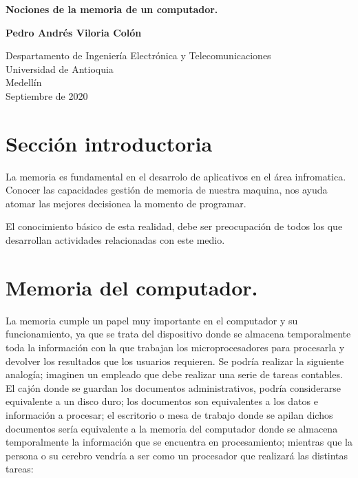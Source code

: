 \documentclass{article}
\begin{document}
\begin{titlepage}
    \begin{center}
        \vspace*{1cm}
            
        \Huge
        \textbf{Nociones de la memoria de un computador.}
            
        \vspace{0.5cm}
        \LARGE
       
        \vspace{1.5cm}
            
        \textbf{Pedro Andrés Viloria Colón}
            
        \vfill
            
        \vspace{0.8cm}
            
        \Large
        Despartamento de Ingeniería Electrónica y Telecomunicaciones\\
        Universidad de Antioquia\\
        Medellín\\
        Septiembre de 2020
            
    \end{center}
\end{titlepage}

\tableofcontents

\section{Sección introductoria}
La memoria es fundamental en el desarrolo de aplicativos en el área infromatica. Conocer las capacidades gestión de memoria de nuestra maquina, nos ayuda  atomar las mejores decisionea la momento de programar.


El conocimiento básico de esta realidad, debe ser preocupación de todos los que desarrollan actividades relacionadas con este medio.

\section{Memoria del computador.} \label{contenido}
La memoria cumple un papel muy importante en el computador y su funcionamiento, ya que se
trata del dispositivo donde se almacena temporalmente toda la información con la que trabajan
los microprocesadores para procesarla y devolver los resultados que los usuarios requieren.
Se podría realizar la siguiente analogía; imaginen un empleado que debe realizar una serie de tareas contables. El cajón donde se guardan los documentos administrativos, podría considerarse equivalente a un disco duro; los documentos son equivalentes a los datos e información a procesar; el escritorio o mesa de trabajo donde se apilan dichos documentos
sería equivalente a la memoria del computador donde se almacena temporalmente la
información que se encuentra en procesamiento; mientras que la persona o su cerebro vendría
a ser como un procesador que realizará las distintas tareas:
    
\end{document}
